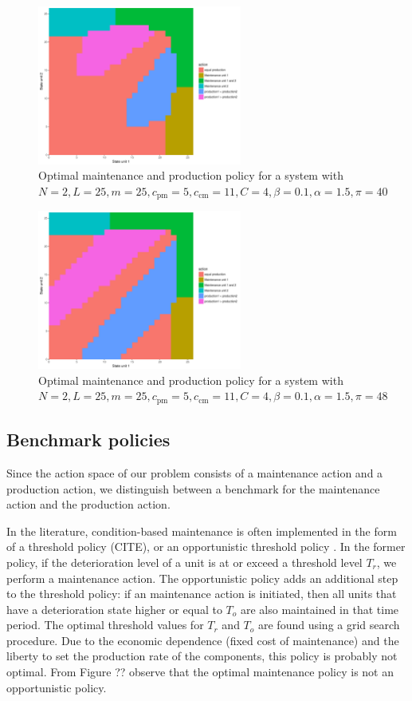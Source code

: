 \documentclass[a4paper,12pt]{article}
\begin{document}
\begin{figure}[H] \label{main-prod-policy3}
	\centering
	\includegraphics[width=0.6\textwidth]{figures/optimal_action_plot3}
	\caption{Optimal maintenance and production policy for a system with $N=2, L=25, m=25, c_\text{pm} = 5, c_\text{cm} = 11, C=4, \beta=0.1, \alpha=1.5, \pi=40$}
\end{figure}
\begin{figure}[H] \label{main-prod-policy4}
	\centering
	\includegraphics[width=0.6\textwidth]{figures/optimal_action_plot0}
	\caption{Optimal maintenance and production policy for a system with $N=2, L=25, m=25, c_\text{pm} = 5, c_\text{cm} = 11, C=4, \beta=0.1, \alpha=1.5, \pi=48$}
\end{figure}

\subsection{Benchmark policies}
Since the action space of our problem consists of a maintenance action and a production action, we distinguish between a benchmark for the maintenance action and the production action. 

In the literature, condition-based maintenance is often implemented in the form of a threshold policy (CITE), or an opportunistic threshold policy \citep{ZHANG2015176, ZHOU2009361} . In the former policy, if the deterioration level of a unit is at or exceed a threshold level $T_r$, we perform a maintenance action. The opportunistic policy adds an additional step to the threshold policy: if an maintenance action is initiated, then all units that have a deterioration state higher or equal to $T_o$ are also maintained in that time period. The optimal threshold values for $T_r$ and $T_o$ are found using a grid search procedure. Due to the economic dependence (fixed cost of maintenance) and the liberty to set the production rate of the components, this policy is probably not optimal. From Figure ?? observe that the optimal maintenance policy is not an opportunistic policy.
\end{document}
